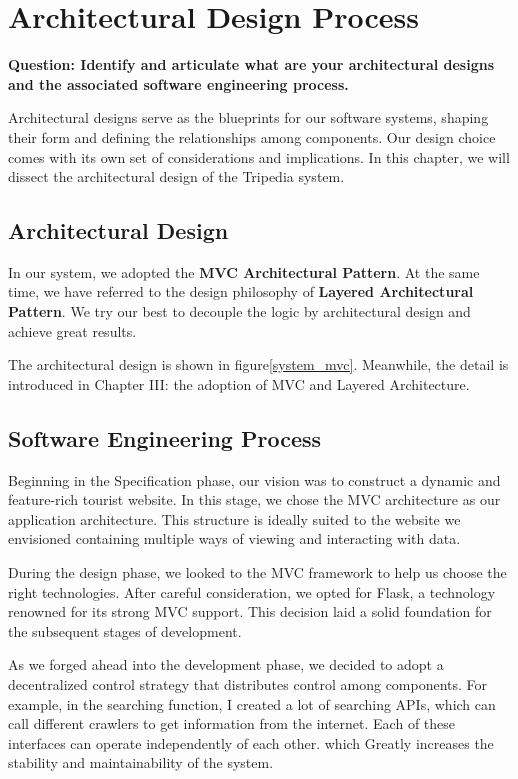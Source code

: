 \documentclass[conference]{IEEEtran}
\begin{document}
\section{\textbf{Architectural Design Process}}

\textbf{Question: Identify and articulate what are your architectural designs and the associated
software engineering process.}

Architectural designs serve as the blueprints for our software systems, shaping their form and defining the relationships among components. Our design choice comes with its own set of considerations and implications. In this chapter, we will dissect the architectural design of the Tripedia system. 


\subsection{\textbf{Architectural Design}}

In our system, we adopted the \textbf{MVC Architectural Pattern}. At the same time, we have referred to the design philosophy of \textbf{Layered Architectural Pattern}. We try our best to decouple the logic by architectural design and achieve great results.

The architectural design is shown in figure\ref{system_mvc}. Meanwhile, the detail is introduced in Chapter III: the adoption of MVC and Layered Architecture.


\subsection{\textbf{Software Engineering Process}}

Beginning in the Specification phase, our vision was to construct a dynamic and feature-rich tourist website. In this stage, we chose the MVC architecture as our application architecture. This structure is ideally suited to the website we envisioned containing multiple ways of viewing and interacting with data.

During the design phase, we looked to the MVC framework to help us choose the right technologies. After careful consideration, we opted for Flask, a technology renowned for its strong MVC support. This decision laid a solid foundation for the subsequent stages of development.

As we forged ahead into the development phase, we decided to adopt a decentralized control strategy that distributes control among components. For example, in the searching function, I created a lot of searching APIs, which can call different crawlers to get information from the internet. Each of these interfaces can operate independently of each other. which Greatly increases the stability and maintainability of the system.
\end{document}
